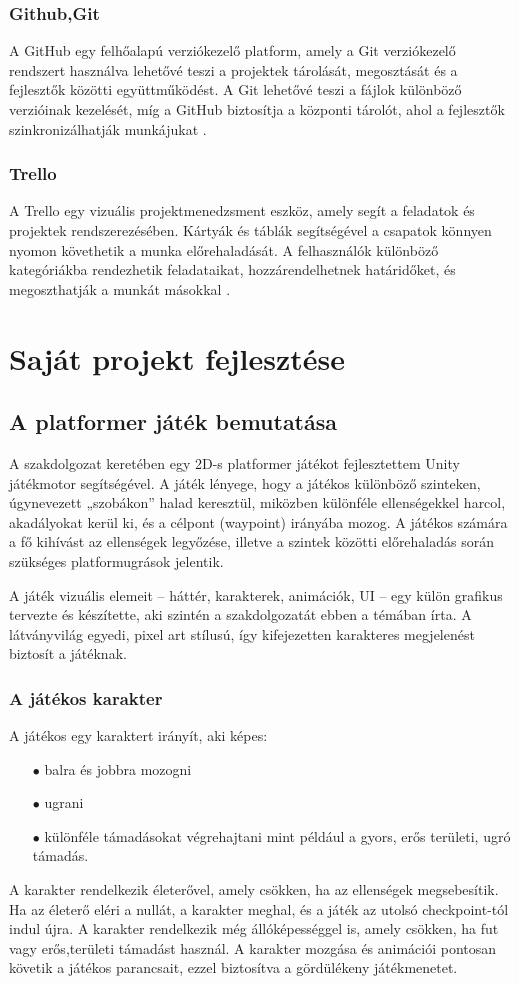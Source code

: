 \documentclass[
]{thesis-ekf}
\theoremstyle{definition}
\theoremstyle{remark}
\begin{document}
\subsection{Github,Git}
A GitHub egy felhőalapú verziókezelő platform, amely a Git verziókezelő rendszert használva lehetővé teszi a projektek tárolását, megosztását és a fejlesztők közötti együttműködést. A Git lehetővé teszi a fájlok különböző verzióinak kezelését, míg a GitHub biztosítja a központi tárolót, ahol a fejlesztők szinkronizálhatják munkájukat \cite{GithubAndGit}.
\subsection{Trello}
A Trello egy vizuális projektmenedzsment eszköz, amely segít a feladatok és projektek rendszerezésében. Kártyák és táblák segítségével a csapatok könnyen nyomon követhetik a munka előrehaladását. A felhasználók különböző kategóriákba rendezhetik feladataikat, hozzárendelhetnek határidőket, és megoszthatják a munkát másokkal \cite{Trello}.


\chapter{Saját projekt fejlesztése}
\section{A platformer játék bemutatása}
A szakdolgozat keretében egy 2D-s platformer játékot fejlesztettem Unity játékmotor segítségével. A játék lényege, hogy a játékos különböző szinteken, úgynevezett „szobákon” halad keresztül, miközben különféle ellenségekkel harcol, akadályokat kerül ki, és a célpont (waypoint) irányába mozog. A játékos számára a fő kihívást az ellenségek legyőzése, illetve a szintek közötti előrehaladás során szükséges platformugrások jelentik.

A játék vizuális elemeit – háttér, karakterek, animációk, UI – egy külön grafikus tervezte és készítette, aki szintén a szakdolgozatát ebben a témában írta. A látványvilág egyedi, pixel art stílusú, így kifejezetten karakteres megjelenést biztosít a játéknak.
\subsection{A játékos karakter}
A játékos egy karaktert irányít, aki képes:
\begin{itemize}
	\item[$\bullet$] balra és jobbra mozogni
	\item[$\bullet$] ugrani
	\item[$\bullet$] különféle támadásokat végrehajtani mint például a gyors, erős területi, ugró támadás.
\end{itemize}
A karakter rendelkezik életerővel, amely csökken, ha az ellenségek megsebesítik. Ha az életerő eléri a nullát, a karakter meghal, és a játék az utolsó checkpoint-tól indul újra. A karakter rendelkezik még állóképességgel is, amely csökken, ha fut vagy erős,területi támadást használ.
A karakter mozgása és animációi pontosan követik a játékos parancsait, ezzel biztosítva a gördülékeny játékmenetet.
\end{document}
